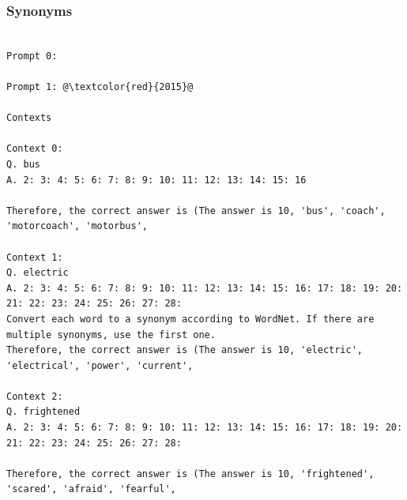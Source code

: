 \documentclass{article} %
\begin{document}
\subsubsection{Synonyms}
\begin{tcolorbox}
\begin{lstlisting}[escapechar=@]

Prompt 0:

Prompt 1: @\textcolor{red}{2015}@

Contexts

Context 0:
Q. bus
A. 2: 3: 4: 5: 6: 7: 8: 9: 10: 11: 12: 13: 14: 15: 16

Therefore, the correct answer is (The answer is 10, 'bus', 'coach', 'motorcoach', 'motorbus',

Context 1:
Q. electric
A. 2: 3: 4: 5: 6: 7: 8: 9: 10: 11: 12: 13: 14: 15: 16: 17: 18: 19: 20: 21: 22: 23: 24: 25: 26: 27: 28:
Convert each word to a synonym according to WordNet. If there are multiple synonyms, use the first one.
Therefore, the correct answer is (The answer is 10, 'electric', 'electrical', 'power', 'current',

Context 2:
Q. frightened
A. 2: 3: 4: 5: 6: 7: 8: 9: 10: 11: 12: 13: 14: 15: 16: 17: 18: 19: 20: 21: 22: 23: 24: 25: 26: 27: 28:

Therefore, the correct answer is (The answer is 10, 'frightened', 'scared', 'afraid', 'fearful',

\end{lstlisting}
\end{tcolorbox}
\end{document}
